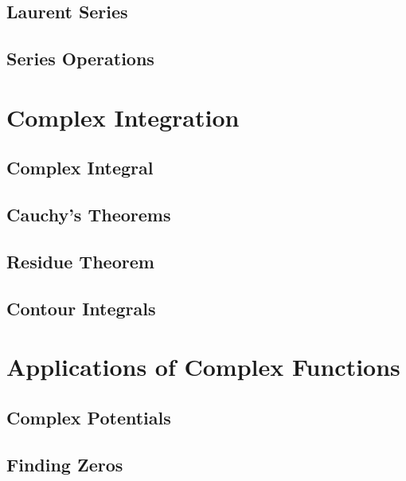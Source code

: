 \documentclass[12pt, a4paper, oneside, openright, titlepage]{book}
\begin{document}
\section{Laurent Series}


\section{Series Operations}



\chapter{Complex Integration}

\section{Complex Integral}


\section{Cauchy's Theorems}


\section{Residue Theorem}


\section{Contour Integrals}


\chapter{Applications of Complex Functions}


\section{Complex Potentials}


\section{Finding Zeros}
\end{document}
